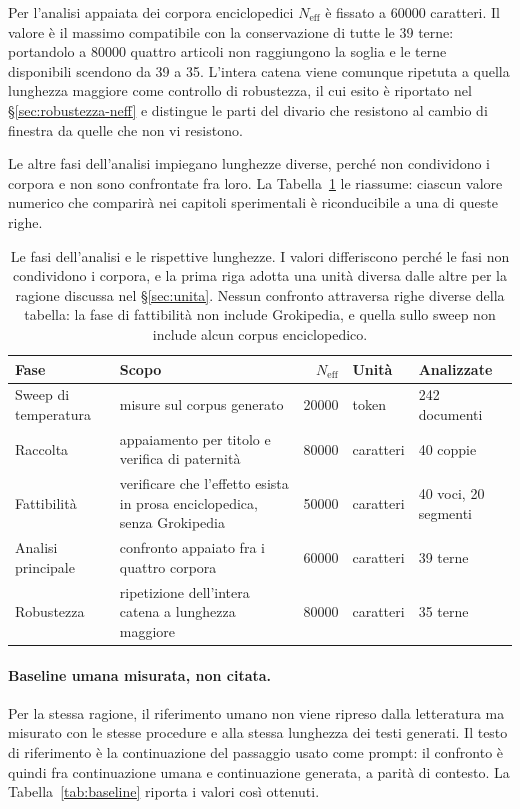 Per l'analisi appaiata dei corpora enciclopedici $N_{\mathrm{eff}}$ è fissato a
\num{60000} caratteri. Il valore è il massimo compatibile con la conservazione
di tutte le 39 terne: portandolo a \num{80000} quattro articoli non
raggiungono la soglia e le terne disponibili scendono da 39 a 35. L'intera
catena viene comunque ripetuta a quella lunghezza maggiore come controllo di
robustezza, il cui esito è riportato nel §\ref{sec:robustezza-neff} e distingue
le parti del divario che resistono al cambio di finestra da quelle che non vi
resistono.

Le altre fasi dell'analisi impiegano lunghezze diverse, perché non condividono i
corpora e non sono confrontate fra loro. La Tabella~\ref{tab:fasi} le riassume:
ciascun valore numerico che comparirà nei capitoli sperimentali è riconducibile
a una di queste righe.

\begin{table}[htbp]
\centering
\small
\begin{tabular}{@{}>{\raggedright\arraybackslash}p{2.9cm}>{\raggedright\arraybackslash}p{4.3cm}rll@{}}
\toprule
Fase & Scopo & $N_{\mathrm{eff}}$ & Unità & Analizzate \\
\midrule
Sweep di temperatura & misure sul corpus generato
  & \num{20000} & token & 242 documenti \\
\addlinespace
Raccolta & appaiamento per titolo e verifica di paternità
  & \num{80000} & caratteri & 40 coppie \\
\addlinespace
Fattibilità & verificare che l'effetto esista in prosa enciclopedica, senza
  Grokipedia & \num{50000} & caratteri & 40 voci, 20 segmenti \\
\addlinespace
Analisi principale & confronto appaiato fra i quattro corpora
  & \num{60000} & caratteri & 39 terne \\
\addlinespace
Robustezza & ripetizione dell'intera catena a lunghezza maggiore
  & \num{80000} & caratteri & 35 terne \\
\bottomrule
\end{tabular}
\caption{Le fasi dell'analisi e le rispettive lunghezze. I valori differiscono
perché le fasi non condividono i corpora, e la prima riga adotta una unità
diversa dalle altre per la ragione discussa nel §\ref{sec:unita}. Nessun
confronto attraversa righe diverse della tabella: la fase di fattibilità non
include Grokipedia, e quella sullo sweep non include alcun corpus
enciclopedico.}
\label{tab:fasi}
\end{table}

\paragraph{Baseline umana misurata, non citata.}
Per la stessa ragione, il riferimento umano non viene ripreso dalla letteratura
ma misurato con le stesse procedure e alla stessa lunghezza dei testi generati.
Il testo di riferimento è la continuazione del passaggio usato come prompt: il
confronto è quindi fra continuazione umana e continuazione generata, a parità di
contesto. La Tabella~\ref{tab:baseline} riporta i valori così ottenuti.

